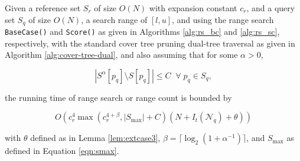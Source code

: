 \begin{thm}
Given a reference set $S_r$ of size $O(N)$ with expansion constant $c_r$, and a
query set $S_q$ of size $O(N)$, a search range of $[l, u]$, and using the range
search \texttt{BaseCase()} and \texttt{Score()} as given in Algorithms
\ref{alg:rs_bc} and \ref{alg:rs_sc}, respectively, with the standard cover tree
pruning dual-tree traversal as given in Algorithm \ref{alg:cover-tree-dual}, and
also assuming that for some $\alpha > 0$,

\begin{equation}
| S^{\alpha}[p_q] \setminus S[p_q] | \le C \; \; \forall \; p_q \in S_q,
\end{equation}


\noindent the running time of range search or range count is bounded by

\begin{equation}
O\left(c_r^{4} \max\left(c_r^{4 + \beta}, |S_{\max}| + C\right) (N +
I_t(\mathscr{N}_q) + \theta)
\right)
\end{equation}

with $\theta$ defined as in Lemma \ref{lem:extcase3},
$\beta = \lceil \log_2 (1 + \alpha^{-1}) \rceil$, and $S_{\max}$ as defined in
Equation \ref{eqn:smax}.
\label{thm:rs}
\end{thm}

